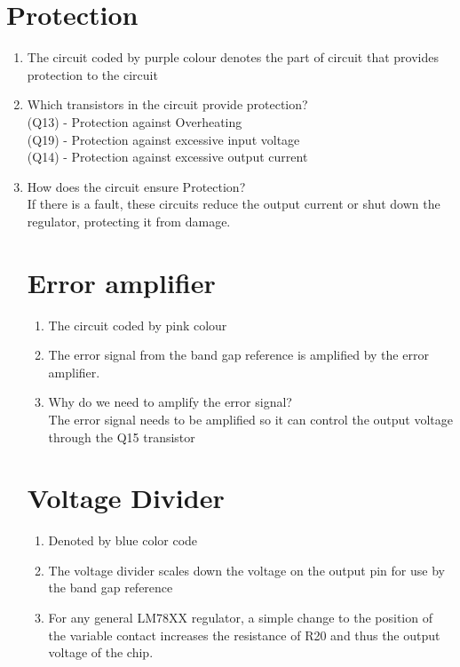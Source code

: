 \documentclass[journal,12pt,twocolumn]{IEEEtran}
\renewcommand\thesection{\arabic{section}}
\begin{document}
\section{Protection}
\begin{enumerate}[label=\thesection.\arabic*,ref=\thesection.\theenumi]
\item The circuit coded by purple colour denotes the part of circuit that provides protection to the circuit
\item Which transistors in the circuit provide protection?\\
\solution
(Q13) - Protection against Overheating\\
(Q19) - Protection against excessive input voltage\\
(Q14) - Protection against excessive output current
\item How does the circuit ensure Protection?\\
\solution
If there is a fault, these circuits reduce the output current or
shut down the regulator, protecting it from damage.

\section{Error amplifier}
\begin{enumerate}[label=\thesection.\arabic*,ref=\thesection.\theenumi]
\item The circuit coded by pink colour 
\item The error signal from the band gap reference is amplified by
the error amplifier.
\item Why do we need to amplify the error signal?\\
\solution
The error signal needs to be amplified so it can control the output voltage through the Q15 transistor
\end{enumerate}

\section{Voltage Divider}
\begin{enumerate}[label=\thesection.\arabic*,ref=\thesection.\theenumi]
\item Denoted by blue color code
\item The voltage divider scales down the voltage on the output pin
for use by the band gap reference
\item For any general LM78XX regulator, a simple change to the position of the variable contact increases the resistance of R20 and thus
the output voltage of the chip.
\end{enumerate}



\end{enumerate}
\end{document}
